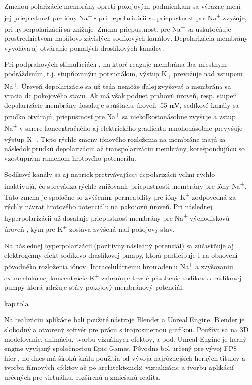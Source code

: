 Zmenou polarizácie membrány oproti pokojovým podmienkam sa výrazne mení jej priepustnosť pre ióny Na\textsuperscript{+} - pri depolarizácii sa priepustnosť pre Na\textsuperscript{+} zvyšuje, 
pri hyperpolarizácii sa znižuje. Zmena priepustnosti pre Na\textsuperscript{+} sa uskutočňuje prostredníctvom napäťovo závislých sodíkových kanálov. Depolarizácia membrány vyvoláva aj 
otváranie pomalých draslíkových kanálov. 

Pri podprahových stimuláciách , na ktoré reaguje membrána iba miestnym podráždením, t.j. stupňovaným potenciálom, výstup K\textsubscript{+} prevažuje nad vstupom Na\textsuperscript{+}. 
Úroveň depolarizácie sa už teda nemôže ďalej zvyšovať a membrána sa vracia do pokojového stavu. Ak má však podnet prahovú úroveň, resp. stupeň depolarizácie membrány dosahuje spúšťaciu úroveň
-55 mV, sodíkové kanály sa prudko otvárajú, priepustnosť pre Na\textsuperscript{+} sa niekoľkostonásobne zvyšuje a vstup Na\textsuperscript{+} v smere koncentračného aj elektrického gradientu
mnohonásobne prevyšuje výstup K\textsuperscript{+}. Tieto rýchle zmeny iónového rozloženia na membráne majú za následok prudkú depolarizáciu až transpolarizáciu membrány, korešpondujúcu so vzostupným
ramenom hrotového potenciálu.

Sodíkové kanály sa aj napriek pretrvávajúcej depolarizácii veľmi rýchlo inaktivujú, čo sprevádza rýchle znižovanie priepustnosti membrány pre ióny Na\textsuperscript{+}. Táto zmena je spoločne 
so zvýšením permeability pre ióny K\textsuperscript{+} zodpovedná za rýchly návrat hrotového potenciálu na pokojovú úroveň. Pri následnej hyperpolarizácii už dosahuje priepustnosť membrány pre 
Na\textsuperscript{+} východiskovú úroveň , kým pre K\textsuperscript{+} zostáva zvýšená nad pokojový stav.

Na následnej hyperpolarizácii (pozitívny následný potenciál) sa zúčastňuje aj elektrogénny efekt sodíkovo-draslíkovej pumpy, ktorá participuje i na obnovení pôvodného rozloženia iónov.
Intracelulárnemu hromadeniu Na\textsuperscript{+} a zvyšovaniu extracelulárnej koncentrácie K\textsuperscript{+} zabraňuje trvalé pôsobenie sodíkovo-draslíkovej pumpy ktorá udržuje stály pokojový 
membránový potenciál. \cite{javorkaLekarskaFyziologiaUcebnica2001}

 kapitola 

Na realizáciu aplikácie boli použité nástroje Blender a Unreal Engine. Blender je slobodný a otvorený  softvér pre prácu s trojrozmernou grafikou. Používa sa na 3D modelovanie,
animáciu, tvorbu vizuálnych efektov, a pod. Unreal Engine je herný engine vyvíjaný spoločnosťou Epic Games. Pôvodne bol určený pre vývoj FPS hier , no dnes má širokú škálu použitia
od vývoja najrôznejších herných titulov a tvorbu filmových efektov až po architektonické vizualizácie a tvorbu aplikácií určených pre virtuálnu, rozšírenú a zmiešanú realitu.

